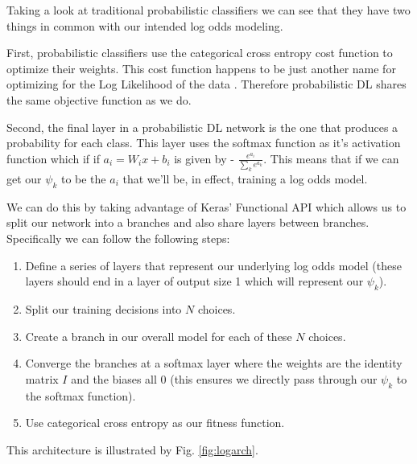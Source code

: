 \documentclass[11pt]{article}
\begin{document}
Taking a look at traditional probabilistic classifiers we can see that they have two things in common with our intended log odds modeling. 

First, probabilistic classifiers use the categorical cross entropy cost function to optimize their weights. This cost function happens to be just another name for optimizing for the Log Likelihood of the data \cite{durr}. Therefore probabilistic DL shares the same objective function as we do.

Second, the final layer in a probabilistic DL network is the one that produces a probability for each class. This layer uses the softmax function as it's activation function which if if $a_i=W_i x+b_i$ is given by - $\frac{e^{a_i}}{\sum_k e^{a_k}}$. This means that if we can get our $\psi_k$ to be the $a_i$ that we'll be, in effect, training a log odds model.

We can do this by taking advantage of Keras' Functional API \cite{kerasfunctional} which allows us to split our network into a branches and also share layers between branches. Specifically we can follow the following steps:

\begin{enumerate}
\item Define a series of layers that represent our underlying log odds model (these layers should end in a layer of output size 1 which will represent our $\psi_k$).
\item Split our training decisions into $N$ choices.
\item Create a branch in our overall model for each of these $N$ choices.
\item Converge the branches at a softmax layer where the weights are the identity matrix $I$ and the biases all 0 (this ensures we directly pass through our $\psi_k$ to the softmax function).
\item Use categorical cross entropy as our fitness function.
\end{enumerate}

This architecture is illustrated by Fig. \ref{fig:logarch}.
\end{document}
